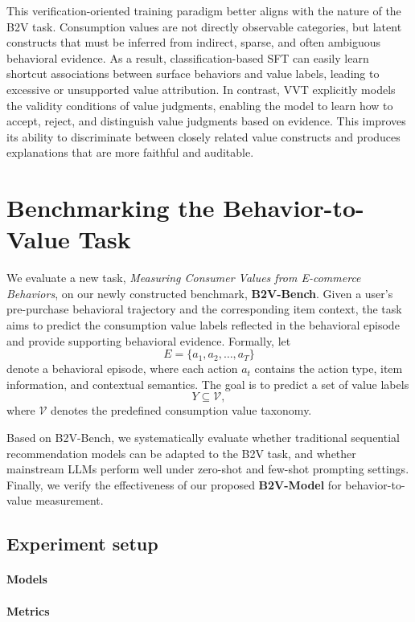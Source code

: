 \documentclass[11pt]{article}
\begin{document}
This verification-oriented training paradigm better aligns with the nature of the B2V task. Consumption values are not directly observable categories, but latent constructs that must be inferred from indirect, sparse, and often ambiguous behavioral evidence. As a result, classification-based SFT can easily learn shortcut associations between surface behaviors and value labels, leading to excessive or unsupported value attribution. In contrast, VVT explicitly models the validity conditions of value judgments, enabling the model to learn how to accept, reject, and distinguish value judgments based on evidence. This improves its ability to discriminate between closely related value constructs and produces explanations that are more faithful and auditable.




\section{Benchmarking the Behavior-to-Value Task}
We evaluate a new task, \textit{Measuring Consumer Values from E-commerce Behaviors}, on our newly constructed benchmark, \textbf{B2V-Bench}. Given a user's pre-purchase behavioral trajectory and the corresponding item context, the task aims to predict the consumption value labels reflected in the behavioral episode and provide supporting behavioral evidence. Formally, let
\[
E = \{a_1, a_2, \ldots, a_T\}
\]
denote a behavioral episode, where each action \(a_t\) contains the action type, item information, and contextual semantics. The goal is to predict a set of value labels
\[
Y \subseteq \mathcal{V},
\]
where \(\mathcal{V}\) denotes the predefined consumption value taxonomy.

Based on B2V-Bench, we systematically evaluate whether traditional sequential recommendation models can be adapted to the B2V task, and whether mainstream LLMs perform well under zero-shot and few-shot prompting settings. Finally, we verify the effectiveness of our proposed \textbf{B2V-Model} for behavior-to-value measurement.

\subsection{Experiment setup}
\paragraph{Models}
\paragraph{Metrics}
\end{document}
